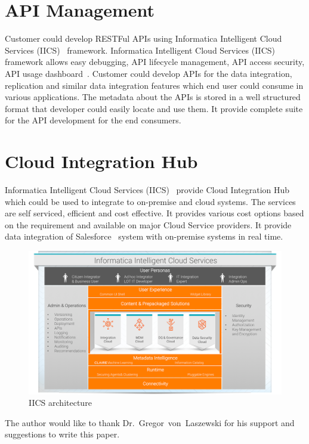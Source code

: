 \section{API Management}

Customer could develop RESTFul APIs using Informatica Intelligent
Cloud Services (IICS)~\cite{hid-sp18-511-iics} framework. Informatica
Intelligent Cloud Services (IICS)~\cite{hid-sp18-511-iics} framework
allows easy debugging, API lifecycle management, API access security,
API usage dashboard~\cite{hid-sp18-511-iics-pricing}. Customer could
develop APIs for the data integration, replication and similar data
integration features which end user could consume in various
applications. The metadata about the APIs is stored in a well
structured format that developer could easily locate and use them. It
provide complete suite for the API development for the end consumers.

\section{Cloud Integration Hub}
Informatica Intelligent Cloud Services (IICS)~\cite{hid-sp18-511-iics}
provide Cloud Integration Hub~\cite{hid-sp18-511-iics-hub} which could
be used to integrate to on-premise and cloud systems. The services are
self serviced, efficient and cost effective. It provides various cost
options based on the requirement and available on major Cloud Service
providers. It provide data integration of
Salesforce~\cite{hid-sp18-511-salesforce} system with on-premise
systems in real time.

\begin{figure}[!ht]
	\centering\includegraphics[width=\columnwidth]
        {images/iics-diagram.png}\caption{IICS
        architecture}\label{f:iics-products}
\end{figure}

\begin{acks}

The author would like to thank Dr.~Gregor~von~Laszewski for his
support and suggestions to write this paper.

\end{acks}


 
